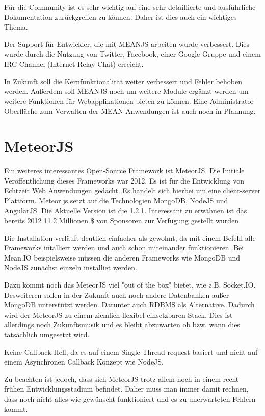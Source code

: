 Für die Community ist es sehr wichtig auf eine sehr detaillierte und ausführliche Dokumentation zurückgreifen zu können. Daher ist dies auch ein wichtiges Thema.

Der Support für Entwickler, die mit MEANJS arbeiten wurde verbessert. Dies wurde durch die Nutzung von Twitter, Facebook, einer Google Gruppe und einem IRC-Channel (Internet Relay Chat) erreicht.

In Zukunft soll die Kernfunktionalität weiter verbessert und Fehler behoben werden. Außerdem soll MEANJS noch um weitere Module ergänzt werden um weitere Funktionen für Webapplikationen bieten zu können. Eine Administrator Oberfläche zum Verwalten der MEAN-Anwendungen ist auch noch in Plannung.

\section{MeteorJS}\label{meteor.js}

Ein weiteres interessantes Open-Source Framework ist MeteorJS. Die
Initiale Veröffentlichung dieses Frameworks war 2012. Es ist für die
Entwicklung von Echtzeit Web Anwendungen gedacht. Es handelt sich
hierbei um eine client-server Plattform. Meteor.js setzt auf die
Technologien MongoDB, NodeJS und AngularJS. Die Aktuelle Version ist
die 1.2.1. Interessant zu erwähnen ist das bereits 2012 11.2 Millionen
\$ von Sponsoren zur Verfügung gestellt wurden.
	
Die Installation verläuft deutlich einfacher als gewohnt, da mit einem Befehl alle Frameworks intalliert werden und auch schon miteinander funktionieren. Bei Mean.IO beispielsweise müssen die anderen Frameworks wie MongoDB und NodeJS zunächst einzeln installiet werden.
	
Dazu kommt noch das MeteorJS viel  "out of the box" bietet, wie z.B. Socket.IO. Desweiteren sollen in der Zukunft auch noch andere Datenbanken außer MongoDB unterstützt werden. Darunter auch RDBMS als Alternative. Dadurch wird der MeteorJS zu einem ziemlich flexibel einsetzbaren Stack. Dies ist allerdings noch Zukunftsmusik und es bleibt abzuwarten ob bzw. wann dies tatsächlich umgesetzt wird.
	
Keine Callback Hell, da es auf einem Single-Thread request-basiert und nicht auf einem Asynchronen Callback Konzept wie NodeJS.
	
Zu beachten ist jedoch, dass sich MeteorJS trotz allem noch in einem recht frühen Entwicklungsstadium befindet. Daher muss man immer damit rechnen, dass noch nicht alles wie gewünscht funktioniert und es zu unerwarteten Fehlern kommt.
	
